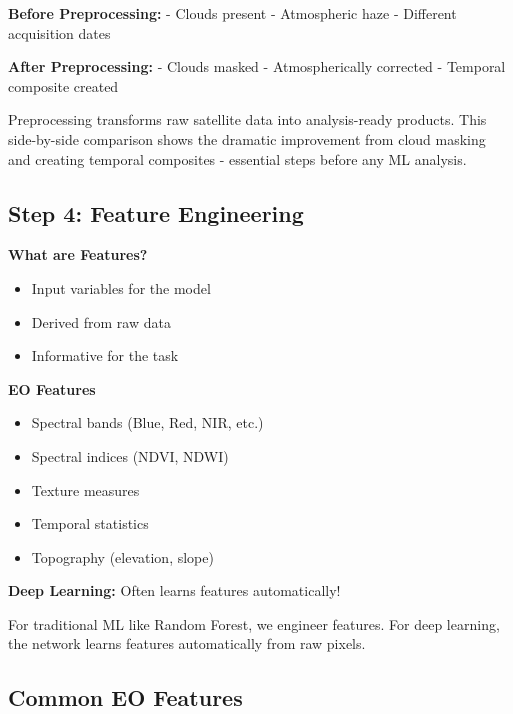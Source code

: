 \documentclass[
  letterpaper,
  DIV=11,
  numbers=noendperiod]{scrartcl}
\providecommand{\tightlist}{%
  \setlength{\itemsep}{0pt}\setlength{\parskip}{0pt}}
\begin{document}
\textbf{Before Preprocessing:} - Clouds present - Atmospheric haze -
Different acquisition dates

\textbf{After Preprocessing:} - Clouds masked - Atmospherically
corrected - Temporal composite created

Preprocessing transforms raw satellite data into analysis-ready
products. This side-by-side comparison shows the dramatic improvement
from cloud masking and creating temporal composites - essential steps
before any ML analysis.

\subsection{Step 4: Feature
Engineering}\label{step-4-feature-engineering}

\textbf{What are Features?}

\begin{itemize}
\tightlist
\item
  Input variables for the model
\item
  Derived from raw data
\item
  Informative for the task
\end{itemize}

\textbf{EO Features}

\begin{itemize}
\tightlist
\item
  Spectral bands (Blue, Red, NIR, etc.)
\item
  Spectral indices (NDVI, NDWI)
\item
  Texture measures
\item
  Temporal statistics
\item
  Topography (elevation, slope)
\end{itemize}

\textbf{Deep Learning:} Often learns features automatically!

For traditional ML like Random Forest, we engineer features. For deep
learning, the network learns features automatically from raw pixels.

\subsection{Common EO Features}\label{common-eo-features}
\end{document}
